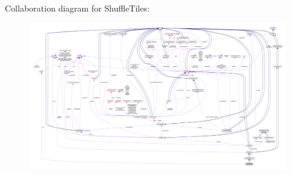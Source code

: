 Collaboration diagram for Shuffle\+Tiles\+:
\nopagebreak
\begin{figure}[H]
\begin{center}
\leavevmode
\includegraphics[width=350pt]{classShuffleTiles__coll__graph}
\end{center}
\end{figure}
